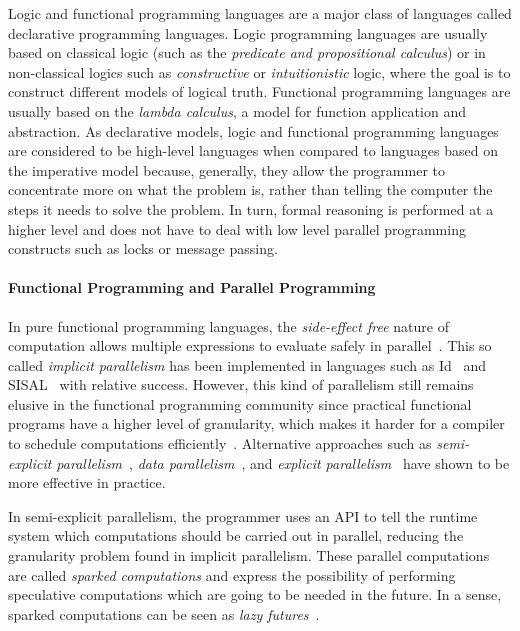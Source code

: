 Logic and functional programming languages are a major class of languages called
declarative programming languages. Logic programming languages are usually based
on classical logic (such as the \emph{predicate and propositional calculus}) or
in non-classical logics such as \emph{constructive} or \emph{intuitionistic}
logic, where the goal is to construct different models of logical truth.
Functional programming languages are usually based on the \emph{lambda
calculus}, a model for function application and abstraction. As declarative
models, logic and functional programming languages are considered to be
high-level languages when compared to languages based on the imperative model
because, generally, they allow the programmer to concentrate more on what the
problem is, rather than telling the computer the steps it needs to solve the
problem. In turn, formal reasoning is performed at a higher level and does not
have to deal with low level parallel programming constructs such as locks or
message passing.

\paragraph{Functional Programming and Parallel Programming}

In pure functional programming languages, the \emph{side-effect free} nature of
computation allows multiple expressions to evaluate safely in
parallel~\cite{Loidl:2003}. This so called \emph{implicit parallelism} has been
implemented in languages such as Id~\cite{Nikhil93anoverview} and
SISAL~\cite{gaudiot2001sisal} with relative success. However, this kind of
parallelism still remains elusive in the functional programming community since
practical functional programs have a higher level of granularity, which makes it
harder for a compiler to schedule computations
efficiently~\cite{haskell_tutorial}.  Alternative approaches such as
\emph{semi-explicit parallelism}~\cite{Marlow:2010}, \emph{data
parallelism}~\cite{Blelloch:1996:PPA:227234.227246}, and \emph{explicit
parallelism}~\cite{harris2005composable} have shown to be more effective in
practice.

In semi-explicit parallelism, the programmer uses an API to tell the runtime
system which computations should be carried out in parallel, reducing the
granularity problem found in implicit parallelism. These parallel computations
are called \emph{sparked computations} and express the possibility of performing
speculative computations which are going to be needed in the future. In a sense,
sparked computations can be seen as \emph{lazy futures}~\cite{Baker:1977}.

